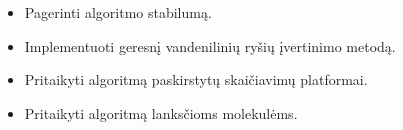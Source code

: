 \begin{itemize}
    \item Pagerinti algoritmo stabilumą.
    \item Implementuoti geresnį vandenilinių ryšių įvertinimo metodą.
    \item Pritaikyti algoritmą paskirstytų skaičiavimų platformai.
    \item Pritaikyti algoritmą lanksčioms molekulėms.
\end{itemize}